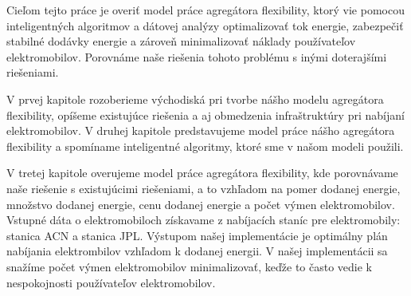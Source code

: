 Cieľom tejto práce je overiť model práce agregátora flexibility, ktorý vie pomocou inteligentných algoritmov a dátovej analýzy optimalizovať tok energie, zabezpečiť stabilné dodávky energie a zároveň minimalizovať náklady používateľov elektromobilov. Porovnáme naše riešenia tohoto problému s inými doterajšími riešeniami. \cite{lee2021acnsim}



V prvej kapitole rozoberieme východiská pri tvorbe nášho modelu agregátora flexibility, opíšeme existujúce riešenia a aj obmedzenia infraštruktúry pri nabíjaní elektromobilov. V druhej kapitole predstavujeme model práce nášho agregátora flexibility a spomíname inteligentné algoritmy, ktoré sme v našom modeli použili. 


V tretej kapitole overujeme model práce agregátora flexibility, kde porovnávame naše riešenie s existujúcimi riešeniami, a to vzhľadom na pomer dodanej energie, množstvo dodanej energie, cenu dodanej energie a počet výmen elektromobilov. Vstupné dáta o elektromobiloch získavame z nabíjacích staníc pre elektromobily: stanica ACN a stanica JPL. Výstupom našej implementácie je optimálny plán nabíjania elektrombilov vzhľadom k dodanej energii. V našej implementácii sa snažíme počet výmen elektromobilov minimalizovať, keďže to často vedie k nespokojnosti používateľov elektromobilov. 





